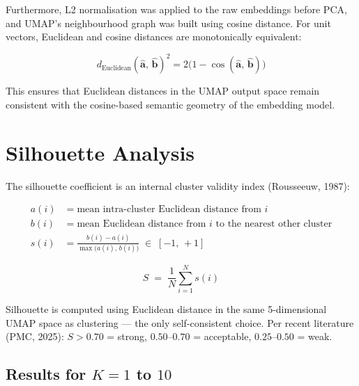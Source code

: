 \documentclass[11pt, a4paper]{article}
\begin{document}
Furthermore, L2 normalisation was applied to the raw embeddings before PCA,
and UMAP's neighbourhood graph was built using cosine distance.  For unit
vectors, Euclidean and cosine distances are monotonically equivalent:

\begin{mathbox}
\[
  d_{\mathrm{Euclidean}}(\hat{\mathbf{a}},\,\hat{\mathbf{b}})^{2}
  = 2\bigl(1 - \cos(\hat{\mathbf{a}},\,\hat{\mathbf{b}})\bigr)
\]
\end{mathbox}

This ensures that Euclidean distances in the UMAP output space remain
consistent with the cosine-based semantic geometry of the embedding model.

\section{Silhouette Analysis}

The silhouette coefficient is an internal cluster validity index
(Rousseeuw, 1987):

\begin{mathbox}
\begin{align*}
  a(i) &= \text{mean intra-cluster Euclidean distance from } i \\[4pt]
  b(i) &= \text{mean Euclidean distance from } i \text{ to the nearest other cluster} \\[4pt]
  s(i) &= \frac{b(i) - a(i)}{\max\bigl(a(i),\,b(i)\bigr)}
           \;\in\; [-1,\, +1]
\end{align*}
\end{mathbox}

\begin{mathbox}
\[
  S \;=\; \frac{1}{N}\sum_{i=1}^{N} s(i)
\]
\end{mathbox}

Silhouette is computed using Euclidean distance in the same 5-dimensional UMAP
space as clustering --- the only self-consistent choice.  Per recent literature
(PMC, 2025): $S > 0.70$ = strong, $0.50$--$0.70$ = acceptable,
$0.25$--$0.50$ = weak.

\subsection{Results for $K = 1$ to $10$}
\end{document}
